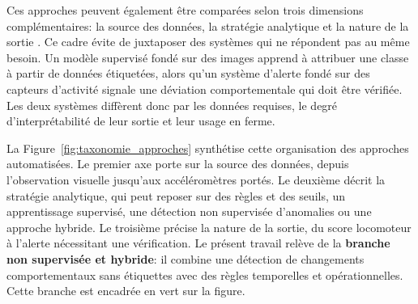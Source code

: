 Ces approches peuvent également être comparées selon trois dimensions complémentaires: la
source des données, la stratégie analytique et la nature de la sortie
\citep{qiao2021review,oleary2020accelerometers}. Ce cadre évite de juxtaposer des systèmes qui
ne répondent pas au même besoin. Un modèle supervisé fondé sur des images apprend à attribuer
une classe à partir de données étiquetées, alors qu'un système d'alerte fondé sur des capteurs
d'activité signale une déviation comportementale qui doit être vérifiée. Les deux systèmes
diffèrent donc par les données requises, le degré d'interprétabilité de leur sortie et leur
usage en ferme.

La Figure~\ref{fig:taxonomie_approches} synthétise cette organisation des approches
automatisées. Le premier axe porte sur la source des données, depuis l'observation visuelle
jusqu'aux accéléromètres portés. Le deuxième décrit la stratégie analytique, qui peut reposer
sur des règles et des seuils, un apprentissage supervisé, une détection non supervisée
d'anomalies ou une approche hybride. Le troisième précise la nature de la sortie, du score
locomoteur à l'alerte nécessitant une vérification. Le présent travail relève de la
\textbf{branche non supervisée et hybride}: il combine une détection de changements
comportementaux sans étiquettes avec des règles temporelles et opérationnelles. Cette branche
est encadrée en vert sur la figure.

